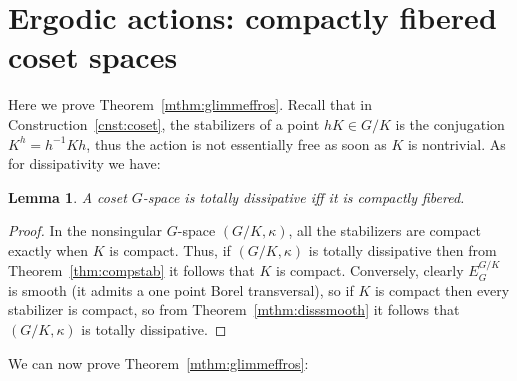 \documentclass{amsart}
\numberwithin{equation}{subsection}
\newtheorem{lem}[thm]{Lemma}
\begin{document}
\section{Ergodic actions: compactly fibered coset spaces}

Here we prove Theorem~\ref{mthm:glimmeffros}. Recall that in Construction~\ref{cnst:coset}, the stabilizers of a point \(hK\in G/K\) is the conjugation \(K^{h}=h^{-1}Kh\), thus the action is not essentially free as soon as \(K\) is nontrivial. As for dissipativity we have:

\begin{lem}
\label{lem:cosdiss}
A coset \(G\)-space is totally dissipative iff it is compactly fibered.
\end{lem}

\begin{proof}
In the nonsingular \(G\)-space \(\left(G/K,\kappa\right)\), all the stabilizers are compact exactly when \(K\) is compact. Thus, if \(\left(G/K,\kappa\right)\) is totally dissipative then from Theorem~\ref{thm:compstab} it follows that \(K\) is compact. Conversely, clearly \(E_{G}^{G/K}\) is smooth (it admits a one point Borel transversal), so if \(K\) is compact then every stabilizer is compact, so from Theorem~\ref{mthm:disssmooth} it follows that \(\left(G/K,\kappa\right)\) is totally dissipative.
\end{proof}

We can now prove Theorem~\ref{mthm:glimmeffros}:
\end{document}
